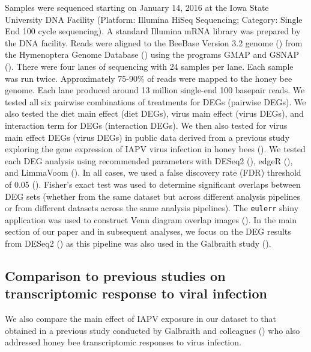 \documentclass[11pt,a4paper,oldfontcommands,openany]{memoir}
\numberwithin{equation}{section} %
\newcommand{\pkg}[1]{{\texttt{#1}}}
\begin{document}
Samples were sequenced starting on January 14, 2016 at the Iowa State University DNA Facility (Platform: Illumina HiSeq Sequencing; Category: Single End 100 cycle sequencing). A standard Illumina mRNA library was prepared by the DNA facility. Reads were aligned to the BeeBase Version 3.2 genome (\citealt{hbGenome}) from the Hymenoptera Genome Database (\citealt{hymenopteraDB}) using the programs GMAP and GSNAP (\citealt{gsnap}). There were four lanes of sequencing with 24 samples per lane. Each sample was run twice. Approximately 75-90\% of reads were mapped to the honey bee genome. Each lane produced around 13 million single-end 100 basepair reads. We tested all six pairwise combinations of treatments for DEGs (pairwise DEGs). We also tested the diet main effect (diet DEGs), virus main effect (virus DEGs), and interaction term for DEGs (interaction DEGs). We then also tested for virus main effect DEGs (virus DEGs) in public data derived from a previous study exploring the gene expression of IAPV virus infection in honey bees (\citealt{galbraith}). We tested each DEG analysis using recommended parameters with DESeq2 (\citealt{deseq2}), edgeR (\citealt{edger}), and LimmaVoom (\citealt{limma}). In all cases, we used a false discovery rate (FDR) threshold of 0.05 (\citealt{benjamini}). Fisher's exact test was used to determine significant overlaps between DEG sets (whether from the same dataset but across different analysis pipelines or from different datasets across the same analysis pipelines). The \pkg{eulerr} shiny application was used to construct Venn diagram overlap images (\citealt{euler}). In the main section of our paper and in subsequent analyses, we focus on the DEG results from DESeq2 (\citealt{deseq2}) as this pipeline was also used in the Galbraith study (\citealt{galbraith}).

\subsection{Comparison to previous studies on transcriptomic response to viral infection}

We also compare the main effect of IAPV exposure in our dataset to that obtained in a previous study conducted by Galbraith and colleagues (\citealt{galbraith}) who also addressed honey bee transcriptomic responses to virus infection.
\end{document}
